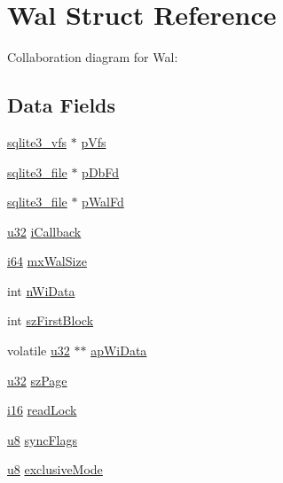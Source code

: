 \hypertarget{struct_wal}{}\section{Wal Struct Reference}
\label{struct_wal}


Collaboration diagram for Wal\+:
\subsection*{Data Fields}
\begin{DoxyCompactItemize}
\item 
\hyperlink{structsqlite3__vfs}{sqlite3\+\_\+vfs} $\ast$ \hyperlink{struct_wal_a59603ca1cedf2bda0ee4e65eb610a0b5}{p\+Vfs}
\item 
\hyperlink{structsqlite3__file}{sqlite3\+\_\+file} $\ast$ \hyperlink{struct_wal_a563d948db79b528e98ecde97be738efd}{p\+Db\+Fd}
\item 
\hyperlink{structsqlite3__file}{sqlite3\+\_\+file} $\ast$ \hyperlink{struct_wal_ad8a716292b0beff8f69c9917de90b9c0}{p\+Wal\+Fd}
\item 
\hyperlink{sqlite3_8c_a03ad5adfaeb9b7640dde78a0cc390319}{u32} \hyperlink{struct_wal_adfec8c5d31fed9aa5fcd3e9a4b576645}{i\+Callback}
\item 
\hyperlink{sqlite3_8c_a2a0f0f4ae7001eb54351f77ea1cdbcfd}{i64} \hyperlink{struct_wal_abb75a5d3d5d1f85ef95bf88712fc4682}{mx\+Wal\+Size}
\item 
int \hyperlink{struct_wal_a488fc6fabac12f933024f02806a1d326}{n\+Wi\+Data}
\item 
int \hyperlink{struct_wal_ace35af8f2d47788c9995a1561f4829d8}{sz\+First\+Block}
\item 
volatile \hyperlink{sqlite3_8c_a03ad5adfaeb9b7640dde78a0cc390319}{u32} $\ast$$\ast$ \hyperlink{struct_wal_a470aa4f074ede83f75c2896983a9bdf6}{ap\+Wi\+Data}
\item 
\hyperlink{sqlite3_8c_a03ad5adfaeb9b7640dde78a0cc390319}{u32} \hyperlink{struct_wal_a24f238e67ca9d783c8e9c89ba9003659}{sz\+Page}
\item 
\hyperlink{sqlite3_8c_a7b32340f65cd15f029caad258fb3355c}{i16} \hyperlink{struct_wal_a9fa541ff052d6a89740302a636c242df}{read\+Lock}
\item 
\hyperlink{sqlite3_8c_a74a0f6424ae628af25f23f0a35f6ead3}{u8} \hyperlink{struct_wal_ac97576f0f90c31296207602245d41195}{sync\+Flags}
\item 
\hyperlink{sqlite3_8c_a74a0f6424ae628af25f23f0a35f6ead3}{u8} \hyperlink{struct_wal_a97470c2be335613df4fd3af652fa60dc}{exclusive\+Mode}
$$
\end{DoxyCompactItemize}

